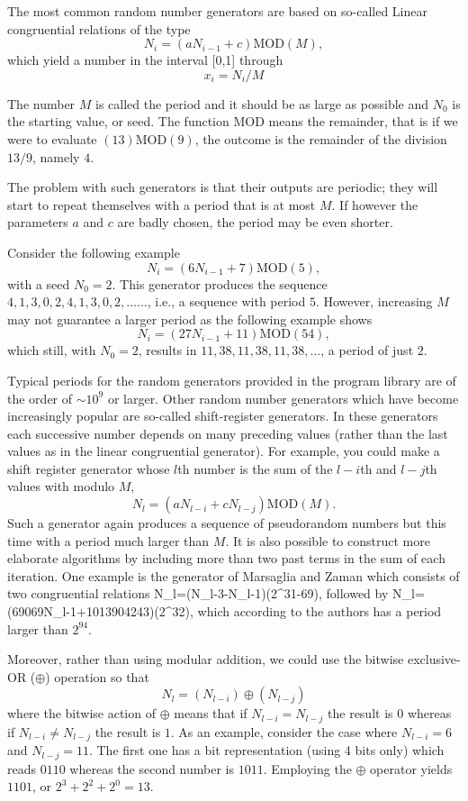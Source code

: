 The most common random number generators are based on so-called
Linear congruential relations of the type
\[
  N_i=(aN_{i-1}+c) \mathrm{MOD} (M),
\]
which yield a number in the interval [0,1] through
\[
  x_i=N_i/M
\]

The number 
$M$ is called the period and it should be as large as possible 
 and 
$N_0$ is the starting value, or seed. The function $\mathrm{MOD}$ means the remainder,
that is if we were to evaluate $(13)\mathrm{MOD}(9)$, the outcome is the remainder
of the division $13/9$, namely $4$.

The problem with such generators is that their outputs are periodic;
they 
will start to repeat themselves with a period that is at most $M$. If however
the parameters $a$ and $c$ are badly chosen, the period may be even shorter.

Consider the following example
\[
  N_i=(6N_{i-1}+7) \mathrm{MOD} (5),
\]
with a seed $N_0=2$. This generator produces the sequence
$4,1,3,0,2,4,1,3,0,2,...\dots$, i.e., a sequence with period $5$.
However, increasing $M$ may not guarantee a larger period as the following
example shows
\[
  N_i=(27N_{i-1}+11) \mathrm{MOD} (54),
\]
which still, with $N_0=2$, results in $11,38,11,38,11,38,\dots$, a period of
just $2$.

Typical periods for the random generators provided in the program library 
are of the order of $\sim 10^9$ or larger. Other random number generators which have
become increasingly popular are so-called shift-register generators.
In these generators each successive number depends on many preceding
values (rather than the last values as in the linear congruential
generator).
For example, you could make a shift register generator whose $l$th 
number is the sum of the $l-i$th and $l-j$th values with modulo $M$,
\[
   N_l=(aN_{l-i}+cN_{l-j})\mathrm{MOD}(M).
\]
Such a generator again produces a sequence of pseudorandom numbers
but this time with a period much larger than $M$.
It is also possible to construct more elaborate algorithms by including
more than two past terms in the sum of each iteration.
One example is the generator of Marsaglia and Zaman \cite{marzaglia1994}
which consists of two congruential relations
\be
   N_l=(N_{l-3}-N_{l-1})(2^{31}-69),
   \label{eq:mz1}
\ee
followed by
\be
   N_l=(69069N_{l-1}+1013904243)(2^{32}),
   \label{eq:mz2}
\ee
which according to the authors has a period larger than $2^{94}$.

Moreover, rather than using modular addition, we could use the bitwise
exclusive-OR ($\oplus$) operation so that
\[
   N_l=(N_{l-i})\oplus (N_{l-j})
\]
where the bitwise action of $\oplus$ means that if $N_{l-i}=N_{l-j}$ the result is
$0$ whereas if $N_{l-i}\ne N_{l-j}$ the result is
$1$. As an example, consider the case where  $N_{l-i}=6$ and $N_{l-j}=11$. The first
one has a bit representation (using 4 bits only) which reads $0110$ whereas the 
second number is $1011$. Employing the $\oplus$ operator yields 
$1101$, or $2^3+2^2+2^0=13$.

